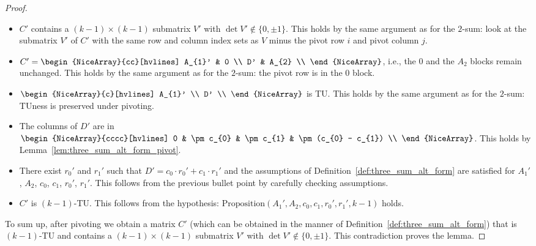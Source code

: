 \documentclass{article}
\theoremstyle{definition}
\begin{document}
\begin{proof}
    \begin{itemize}
        \item $C'$ contains a $(k - 1) \times (k - 1)$ submatrix $V'$ with $\det V' \notin \{0, \pm 1\}$. This holds by the same argument as for the $2$-sum: look at the submatrix $V'$ of $C'$ with the same row and column index sets as $V$ minus the pivot row $i$ and pivot column $j$.
        \item $C' = \begin{NiceArray}{cc}[hvlines] A_{1}' & 0 \\ D' & A_{2} \\ \end{NiceArray}$, i.e., the $0$ and the $A_{2}$ blocks remain unchanged. This holds by the same argument as for the $2$-sum: the pivot row is in the $0$ block.
        \item $\begin{NiceArray}{c}[hvlines] A_{1}' \\ D' \\ \end{NiceArray}$ is TU. This holds by the same argument as for the $2$-sum: TUness is preserved under pivoting.
        \item The columns of $D'$ are in $\begin{NiceArray}{cccc}[hvlines] 0 & \pm c_{0} & \pm c_{1} & \pm (c_{0} - c_{1}) \\ \end{NiceArray}$. This holds by Lemma~\ref{lem:three_sum_alt_form_pivot}.
        \item There exist $r_{0}'$ and $r_{1}'$ such that $D' = c_{0} \cdot r_{0}' + c_{1} \cdot r_{1}'$ and the assumptions of Definition~\ref{def:three_sum_alt_form} are satisfied for $A_{1}'$, $A_{2}$, $c_{0}$, $c_{1}$, $r_{0}'$, $r_{1}'$. This follows from the previous bullet point by carefully checking assumptions.
        \item $C'$ is $(k - 1)$-TU. This follows from the hypothesis: $\mathrm{Proposition}(A_{1}', A_{2}, c_{0}, c_{1}, r_{0}', r_{1}', k - 1)$ holds.
    \end{itemize}

    To sum up, after pivoting we obtain a matrix $C'$ (which can be obtained in the manner of Definition~\ref{def:three_sum_alt_form}) that is $(k - 1)$-TU and contains a $(k - 1) \times (k - 1)$ submatrix $V'$ with $\det V' \notin \{0, \pm 1\}$. This contradiction proves the lemma.
\end{proof}
\end{document}

